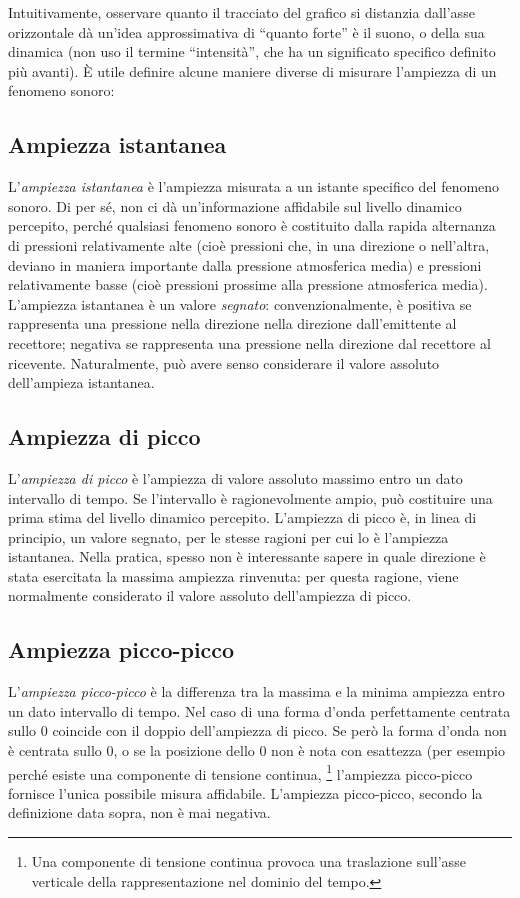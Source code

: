 \documentclass[11pt]{report}
\begin{document}
Intuitivamente, osservare quanto il tracciato del grafico si distanzia dall'asse orizzontale dà un'idea approssimativa di ``quanto forte'' è il suono, o della sua dinamica (non uso il termine ``intensità'', che ha un significato specifico definito più avanti). È utile definire alcune maniere diverse di misurare l'ampiezza di un fenomeno sonoro:

\subsection{Ampiezza istantanea}

L'\emph{ampiezza istantanea} è l'ampiezza misurata a un istante specifico del fenomeno sonoro. Di per sé, non ci dà un'informazione affidabile sul livello dinamico percepito, perché qualsiasi fenomeno sonoro è costituito dalla rapida alternanza di pressioni relativamente alte (cioè pressioni che, in una direzione o nell'altra, deviano in maniera importante dalla pressione atmosferica media) e pressioni relativamente basse (cioè pressioni prossime alla pressione atmosferica media). L'ampiezza istantanea è un valore \emph{segnato}: convenzionalmente, è positiva se rappresenta una pressione nella direzione nella direzione dall'emittente al recettore; negativa se rappresenta una pressione nella direzione dal recettore al ricevente. Naturalmente, può avere senso considerare il valore assoluto dell'ampieza istantanea.

\subsection{Ampiezza di picco}

L'\emph{ampiezza di picco} è l'ampiezza di valore assoluto massimo entro un dato intervallo di tempo. Se l'intervallo è ragionevolmente ampio, può costituire una prima stima del livello dinamico percepito. L'ampiezza di picco è, in linea di principio, un valore segnato, per le stesse ragioni per cui lo è l'ampiezza istantanea. Nella pratica, spesso non è interessante sapere in quale direzione è stata esercitata la massima ampiezza rinvenuta: per questa ragione, viene normalmente considerato il valore assoluto dell'ampiezza di picco.

\subsection{Ampiezza picco-picco}

L'\emph{ampiezza picco-picco} è la differenza tra la massima e la minima ampiezza entro un dato intervallo di tempo. Nel caso di una forma d'onda perfettamente centrata sullo 0 coincide con il doppio dell'ampiezza di picco. Se però la forma d'onda non è centrata sullo 0, o se la posizione dello 0 non è nota con esattezza (per esempio perché esiste una componente di tensione continua,%
\footnote{Una componente di tensione continua provoca una traslazione sull'asse verticale della rappresentazione nel dominio del tempo.}
l'ampiezza picco-picco fornisce l'unica possibile misura affidabile. L'ampiezza picco-picco, secondo la definizione data sopra, non è mai negativa. 
\end{document}
